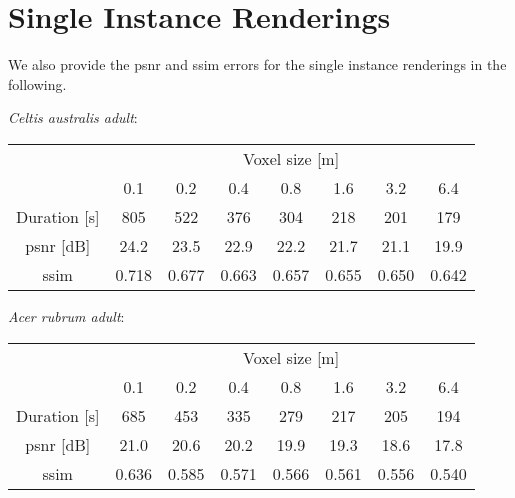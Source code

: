 \section{Single Instance Renderings}
We also provide the \ac{psnr} and \ac{ssim} errors for the single instance renderings in the following.

\textit{Celtis australis adult}:
\begin{center}
    \begin{tabular}{| c | c | c | c | c | c | c | c |}
        \cline{2-8}
        \multicolumn{1}{c|}{} & \multicolumn{7}{c|}{Voxel size [m]} \\
        \cline{2-8}
        \multicolumn{1}{c|}{} & 0.1 & 0.2 & 0.4 & 0.8 & 1.6 & 3.2 & 6.4 \\
        \hline
        Duration [s] & 805 & 522 & 376 & 304 & 218 & 201 & 179 \\
        \hline
        \acs{psnr} [dB] & 24.2 & 23.5 & 22.9 & 22.2 & 21.7 & 21.1 & 19.9 \\
        \hline
        \acs{ssim} & 0.718 & 0.677 & 0.663 & 0.657 & 0.655 & 0.650 & 0.642 \\
        \hline
    \end{tabular}
\end{center}

\textit{Acer rubrum adult}:
\begin{center}
    \begin{tabular}{| c | c | c | c | c | c | c | c |}
        \cline{2-8}
        \multicolumn{1}{c|}{} & \multicolumn{7}{c|}{Voxel size [m]} \\
        \cline{2-8}
        \multicolumn{1}{c|}{} & 0.1 & 0.2 & 0.4 & 0.8 & 1.6 & 3.2 & 6.4 \\
        \hline
        Duration [s] & 685 & 453 & 335 & 279 & 217 & 205 & 194 \\
        \hline
        \acs{psnr} [dB] & 21.0 & 20.6 & 20.2 & 19.9 & 19.3 & 18.6 & 17.8 \\
        \hline
        \acs{ssim} & 0.636 & 0.585 & 0.571 & 0.566 & 0.561 & 0.556 & 0.540 \\
        \hline
    \end{tabular}
\end{center}